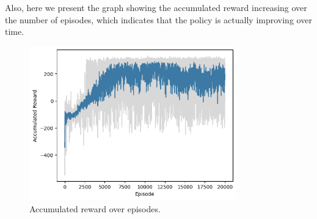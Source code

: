 Also, here we present the graph showing the accumulated reward increasing over the number of episodes, which indicates that the policy is actually improving over time.

\begin{figure}[H]
    \centering
    \includegraphics[width=0.8\textwidth]{Code/accumulated_reward.png}
    \caption{Accumulated reward over episodes.}
    \label{fig:accumulated_reward}
\end{figure}